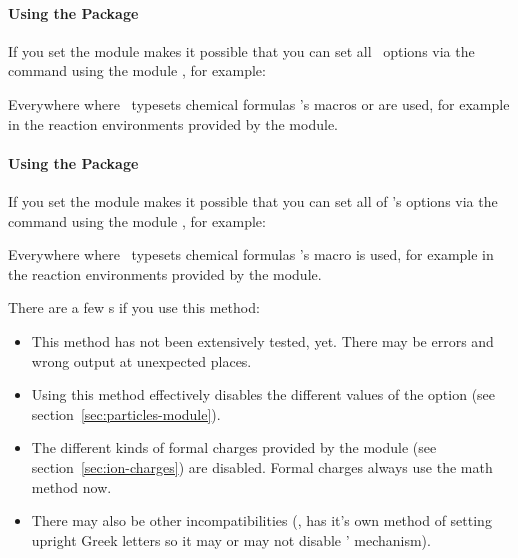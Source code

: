 \documentclass[load-preamble+]{cnltx-doc}
\def\chemmodule*#1{\textquotedblleft#1\textquotedblright}%
\begin{document}
\paragraph{Using the  Package}
If you set  the  module
makes it possible that you can set all \chemformula\ options via the
 command using the module , for example:
\begin{sourcecode}
\end{sourcecode}

Everywhere where \chemmacros\ typesets chemical formulas \chemformula's macros
 or  are used, for example in the reaction environments
provided by the  module.

\paragraph{Using the  Package}\label{sec:using-mhchem}
If you set  the  module makes
it possible that you can set all of 's options via the
 command using the module , for example:
\begin{sourcecode}
\end{sourcecode}

Everywhere where \chemmacros\ typesets chemical formulas 's macro
 is used, for example in the reaction environments provided by the
 module.

There are a few s if you use this method:
\begin{itemize}
  \item This method has not been extensively tested, yet.  There may be errors
     and wrong output at unexpected places.
  \item Using this method effectively disables the different values of the
     option  (see
    section~\ref{sec:particles-module}).
  \item The different kinds of formal charges provided by the
     module (see section~\ref{sec:ion-charges}) are
    disabled.  Formal charges always use the math method now.
  \item There may also be other incompatibilities (\eg,  has it's
    own method of setting upright Greek letters so it may or may not disable
    \chemmacros' mechanism).
\end{itemize}
\end{document}
